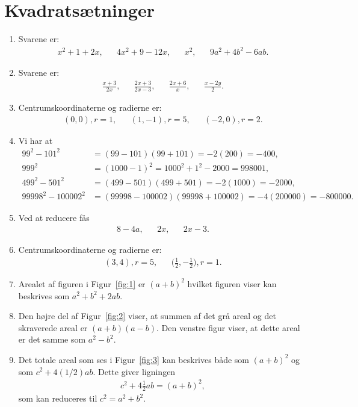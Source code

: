 \section{Kvadratsætninger}
\begin{enumerate}
\item Svarene er:
\begin{align*}
x^2+1+2x,&& 4x^2+9-12x,&& x^2,&& 9a^2+4b^2-6ab.
\end{align*}
\item Svarene er:
\begin{align*}
\frac{x+3}{2x},&& \frac{2x+3}{2x-3},&& \frac{2x+6}{x},&& \frac{x-2y}{2}.
\end{align*}
\item Centrumskoordinaterne og radierne er:
\begin{align*}
(0,0), r=1,&& (1,-1), r=5,&& (-2,0), r=2.
\end{align*}
\item Vi har at
\begin{align*}
99^2-101^2&=(99-101)(99+101)=-2(200)=-400,\\
999^2&=(1000-1)^2=1000^2+1^2-2000= 998001,\\
499^2-501^2&=(499-501)(499+501)=-2(1000)= -2000,\\ 
99998^2-100002^2&=(99998-100002)(99998+100002)=-4(200000)=-800000.
\end{align*}
\item Ved at reducere fås
\begin{align*}
8-4a,&& 2x,&&2x-3.
\end{align*}
\item Centrumskoordinaterne og radierne er:
\begin{align*}
(3,4),r=5,&& \Big( \frac{1}{2},-\frac{1}{2}\Big), r=1.
\end{align*}
\item \label{it:1ans} Arealet af figuren i Figur~\ref{fig:1} er $(a+b)^2$ hvilket figuren viser kan beskrives som $a^2+b^2+2ab$.
\item \label{it:2ans} Den højre del af Figur~\ref{fig:2} viser, at summen af det grå areal og det skraverede areal er $(a+b)(a-b)$. Den venstre figur viser, at dette areal er det samme som $a^2-b^2$.
\item \label{it:3ans} Det totale areal som ses i Figur~\ref{fig:3} kan beskrives både som $(a+b)^2$ og som $c^2+4( 1/2) ab$. Dette giver ligningen
\begin{align*}
c^2+4 \frac{1}{2}ab=(a+b)^2,
\end{align*}
som kan reduceres til $c^2=a^2+b^2$.


\end{enumerate}
